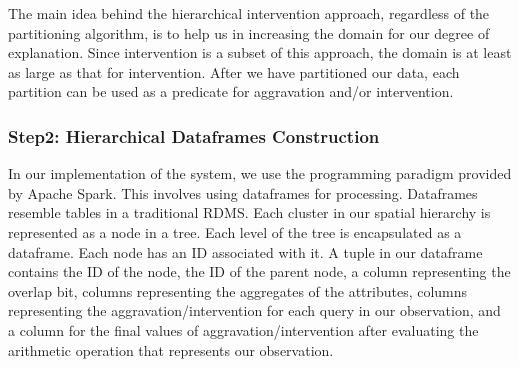 


The main idea behind the hierarchical intervention approach, regardless of the partitioning algorithm, is to help us in increasing the domain for our degree of explanation. Since intervention is a subset of this approach, the domain is at least as large as that for intervention. After we have partitioned our data, each partition can be used as a predicate for aggravation and/or intervention.

\subsubsection{Step2: Hierarchical Dataframes Construction}
In our implementation of the system, we use the programming paradigm provided by Apache Spark. This involves using dataframes for processing. Dataframes resemble tables in a traditional RDMS. Each cluster in our spatial hierarchy is represented as a node in a tree. Each level of the tree is encapsulated as a dataframe. Each node has an ID associated with it. A tuple in our dataframe contains the ID of the node, the ID of the parent node, a column representing the overlap bit, columns representing the aggregates of the attributes, columns representing the aggravation/intervention for each query in our observation, and a column for the final values of aggravation/intervention after evaluating the arithmetic operation that represents our observation. 

